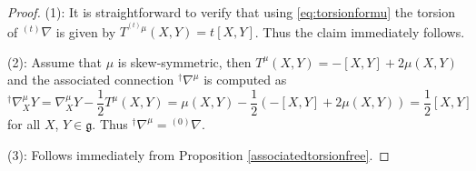 \documentclass[12pt]{amsart}
\theoremstyle{definition}
\theoremstyle{remark}
\numberwithin{equation}{section}
\begin{document}
\begin{proof} 
 (1):  It is straightforward to verify that using \eqref{eq:torsionformu}
 the torsion of ${{}^{(t)} \nabla}$ is given by $T ^{{}^{(t)}\mu} (X,Y) = t [X,Y]$.
 Thus the claim immediately follows.

 (2): Assume that $\mu$ is skew-symmetric, then
 $T^{\mu}(X,Y)=-[X,Y]+2\mu(X,Y)$
 and the associated connection ${}^\dag\nabla^\mu$
 is computed as
\begin{equation*}
{}^\dag\nabla^\mu_{X}Y=
 \nabla^\mu_{X}Y-\frac{1}{2}T^{\mu}(X,Y)
 = \mu(X,Y)-\frac{1}{2}
 \left(
 -[X,Y]+2\mu(X,Y)
 \right)=\frac{1}{2}[X,Y]
\end{equation*}
 for all $X$, $Y\in \mathfrak{g}$. Thus ${}^\dag {\nabla^{\mu}} = {{}^{(0)}\nabla}$.

(3): Follows immediately from  Proposition \ref{associatedtorsionfree}.
\end{proof}
\end{document}
